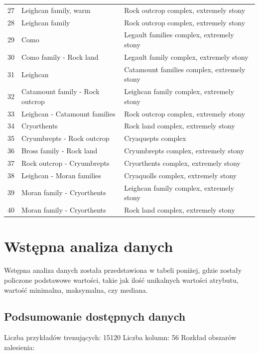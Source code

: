 \documentclass[11pt]{article} %
\begin{document}
{\begin{tabular}{ | l | l | l |}
27
& Leighcan family, warm
& Rock outcrop complex, extremely stony \\
28
& Leighcan family
& Rock outcrop complex, extremely stony \\
29
& Como
& Legault families complex, extremely stony \\
30
& Como family - Rock land
& Legault family complex, extremely stony \\
31
& Leighcan
& Catamount families complex, extremely stony \\
32
& Catamount family - Rock outcrop
& Leighcan family complex, extremely stony \\
33
& Leighcan - Catamount families
& Rock outcrop complex, extremely stony \\
34
& Cryorthents
& Rock land complex, extremely stony \\
35
& Cryumbrepts - Rock outcrop
& Cryaquepts complex \\
36
& Bross family - Rock land
& Cryumbrepts complex, extremely stony \\
37
& Rock outcrop - Cryumbrepts
& Cryorthents complex, extremely stony \\
38
& Leighcan - Moran families
& Cryaquolls complex, extremely stony \\
39
& Moran family - Cryorthents
& Leighcan family complex, extremely stony \\
40
& Moran family - Cryorthents
& Rock land complex, extremely stony \\ \hline
    \end{tabular}
}

\section{Wstępna analiza danych}
Wstępna analiza danych została przedstawiona w tabeli poniżej, gdzie zostały policzone podstawowe wartości, takie jak ilość unikalnych wartości atrybutu, wartość minimalna, maksymalna, czy mediana.

\subsection{Podsumowanie dostępnych danych}

Liczba przykładów trenujących: 15120
Liczba kolumn:  56
Rozkład obszarów zalesienia:
\end{document}
